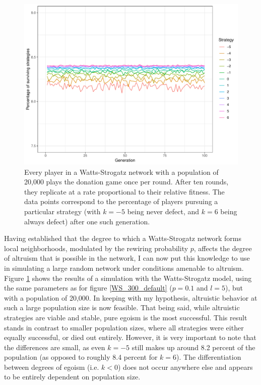 \documentclass{JASSS}
\begin{document}
\begin{figure}
	\centering
	\includegraphics[width=\linewidth]{./figures/results_WS_20000_p005.pdf}
	\caption{Every player in a Watts-Strogatz network with a population of 20,000 plays the donation game once per round. After ten rounds, they replicate at a rate proportional to their relative fitness. The data points correspond to the percentage of players pursuing a particular strategy (with $k=-5$ being never defect, and $k=6$ being always defect) after one such generation.}
	\label{WS_20000_default}
\end{figure}

Having established that the degree to which a Watts-Strogatz network forms local neighborhoods, modulated by the rewiring probability $p$, affects the degree of altruism that is possible in the network, I can now put this knowledge to use in simulating a large random network under conditions amenable to altruism. Figure \ref{WS_20000_default} shows the results of a simulation with the Watts-Strogatz model, using the same parameters as for figure \ref{WS_300_default} ($p=0.1$ and $l=5$), but with a population of 20,000. In keeping with my hypothesis, altruistic behavior at such a large population size is now feasible. That being said, while altruistic strategies are viable and stable, pure egoism is the most successful. This result stands in contrast to smaller population sizes, where all strategies were either equally successful, or died out entirely. However, it is very important to note that the differences are small, as even $k=-5$ still makes up around 8.2 percent of the population (as opposed to roughly 8.4 percent for $k=6$). The differentiation between degrees of egoism (i.e. $k<0$) does not occur anywhere else and appears to be entirely dependent on population size.
\end{document}
